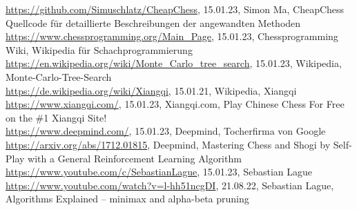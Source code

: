 \documentclass{jpp}
\begin{document}
\url{https://github.com/Simuschlatz/CheapChess}, 15.01.23, Simon Ma, CheapChess Quellcode für detaillierte Beschreibungen der angewandten Methoden
\\
\url{https://www.chessprogramming.org/Main_Page}, 15.01.23, 
Chessprogramming Wiki, Wikipedia für Schachprogrammierung
\\
\url{https://en.wikipedia.org/wiki/Monte_Carlo_tree_search}, 15.01.23, Wikipedia, Monte-Carlo-Tree-Search
\\
\url{https://de.wikipedia.org/wiki/Xiangqi}, 15.01.21, Wikipedia, Xiangqi
\\
\url{https://www.xiangqi.com/}, 15.01.23, Xiangqi.com, Play Chinese Chess For Free on the \#1 Xiangqi Site!
\\
\url{https://www.deepmind.com/}, 15.01.23, Deepmind, Tocherfirma von Google
\\
\url{https://arxiv.org/abs/1712.01815}, Deepmind, Mastering Chess and Shogi by Self-Play with a General Reinforcement Learning Algorithm
\\
\url{https://www.youtube.com/c/SebastianLague}, 15.01.23, Sebastian Lague
\\
\url{https://www.youtube.com/watch?v=l-hh51ncgDI}, 21.08.22, Sebastian Lague, Algorithms Explained – minimax and alpha-beta pruning
\end{document}
